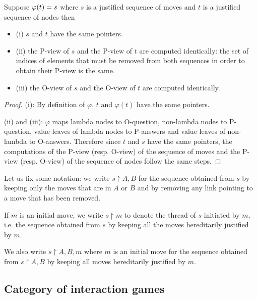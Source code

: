 \begin{property}
\label{proper:phi_pview} Suppose $\varphi(t) = s$ where $s$ is a
justified sequence of moves and $t$ is a justified sequence of nodes
then
\begin{itemize}
\item (i) $s$ and $t$ have the same pointers.
\item (ii) the P-view of $s$ and the P-view of $t$ are computed
identically: the set of indices of elements that must be removed
from both sequences in order to obtain their P-view is the same.
\item (iii) the O-view of $s$ and the O-view of $t$ are computed identically.
\end{itemize}
\end{property}
\begin{proof}
(i): By definition of $\varphi$, $t$ and $\varphi(t)$ have the same
pointers.

(ii) and (iii): $\varphi$ maps lambda nodes to O-question,
non-lambda nodes to P-question, value leaves of lambda nodes to P-answers and
value leaves of non-lambda to O-answers. Therefore since $t$ and $s$ have the
same pointers, the computations of the P-view (resp. O-view) of the
sequence of moves and the P-view (resp. O-view) of the sequence of
nodes follow the same steps.
\end{proof}


Let us fix some notation: we write $s\upharpoonright A,B$ for the
sequence obtained from $s$ by keeping only the moves that are in $A$ or $B$ and by removing any link pointing to a move that
has been removed.

If $m$ is an initial move, we write $s \upharpoonright m$ to
denote the thread of $s$ initiated by $m$, i.e. the sequence obtained from $s$ by keeping all the moves
hereditarily justified by $m$.

We also write $s \upharpoonright A,B,m$ where $m$ is an initial move
for the sequence obtained from $s \upharpoonright A,B$ by keeping
all moves hereditarily justified by $m$.


\subsection{Category of interaction games}

